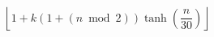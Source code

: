 \documentclass[preview]{standalone}
\begin{document}
\[
    \left\lfloor
        1 + k(1 + (n\ \operatorname{mod}\ 2))\tanh\left(\frac{n}{30}\right)
    \right\rfloor
\]
\end{document}
